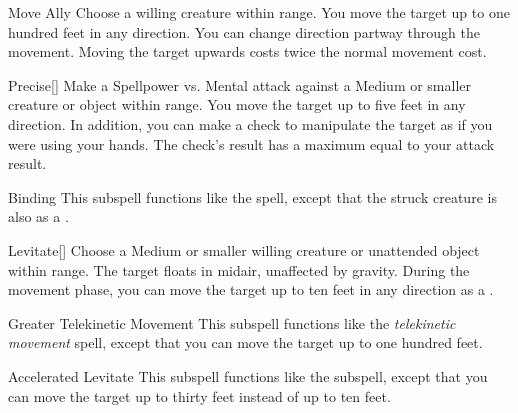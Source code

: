 \begin{ability}[\nth{2}]{Move Ally}
Choose a willing creature within \rngmed range.
You move the target up to one hundred feet in any direction.
You can change direction partway through the movement.
Moving the target upwards costs twice the normal movement cost.
\end{ability}
\vspace{0.25em}


\begin{ability}[\nth{2}]{Precise}[]
Make a Spellpower vs. Mental attack against a Medium or smaller creature or object within \rngclose range.
\hit You move the target up to five feet in any direction.
In addition, you can make a check to manipulate the target as if you were using your hands.
The check's result has a maximum equal to your attack result.
\end{ability}
\vspace{0.25em}


\begin{ability}[\nth{3}]{Binding}
This subspell functions like the  spell, except that the struck creature is also \immobilized as a .
\end{ability}
\vspace{0.25em}


\begin{ability}[\nth{3}]{Levitate}[]
Choose a Medium or smaller willing creature or unattended object within \rngclose range.
The target floats in midair, unaffected by gravity.
During the movement phase, you can move the target up to ten feet in any direction as a .
\end{ability}
\vspace{0.25em}


\begin{ability}[\nth{4}]{Greater Telekinetic Movement}
This subspell functions like the \textit{telekinetic movement} spell, except that you can move the target up to one hundred feet.
\end{ability}
\vspace{0.25em}


\begin{ability}[\nth{5}]{Accelerated Levitate}
This subspell functions like the  subspell, except that you can move the target up to thirty feet instead of up to ten feet.
\end{ability}
\vspace{0.25em}

